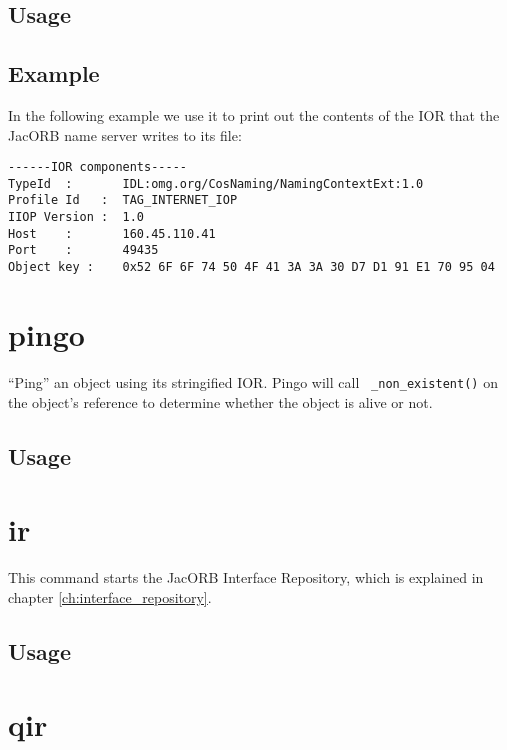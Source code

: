 \documentclass[12pt]{scrbook}
\begin{document}
\subsection*{Usage}


\subsection*{Example}

In the following example we use it to print out the contents of the
IOR that the JacORB name server writes to its file:

\small{\begin{verbatim}
------IOR components-----
TypeId  :       IDL:omg.org/CosNaming/NamingContextExt:1.0
Profile Id   :  TAG_INTERNET_IOP
IIOP Version :  1.0
Host    :       160.45.110.41
Port    :       49435
Object key :    0x52 6F 6F 74 50 4F 41 3A 3A 30 D7 D1 91 E1 70 95 04 
\end{verbatim}
}

\section{pingo}

``Ping'' an object using its stringified IOR. Pingo will call {\tt
  \_non\_existent()} on the object's reference to determine whether
  the object is alive or not.

\subsection*{Usage}


\section{ir}

This command starts the JacORB Interface Repository, which is explained in
chapter \ref{ch:interface_repository}.

\subsection*{Usage}


\section{qir}
\end{document}
